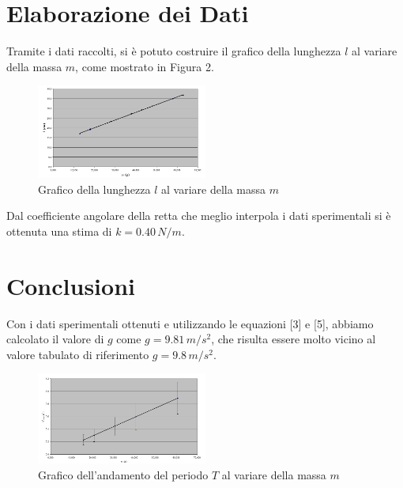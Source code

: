 \documentclass{article}
\begin{document}
    \section{Elaborazione dei Dati}
    Tramite i dati raccolti, si è potuto costruire il grafico della lunghezza $l$ al variare della massa $m$, come mostrato in Figura 2.

    \begin{figure}[H]
        \centering
        \includegraphics[width=0.5\textwidth]{fig2.jpg}
        \caption{Grafico della lunghezza $l$ al variare della massa $m$}
        \label{fig:grafico}
    \end{figure}

    Dal coefficiente angolare della retta che meglio interpola i dati sperimentali si è ottenuta una stima di $k = 0.40 \, N/m$.

    \section{Conclusioni}
    Con i dati sperimentali ottenuti e utilizzando le equazioni [3] e [5], abbiamo calcolato il valore di $g$ come $g = 9.81 \, m/s^2$, che risulta essere molto vicino al valore tabulato di riferimento $g = 9.8 \, m/s^2$.

    \begin{figure}[H]
        \centering
        \includegraphics[width=0.5\textwidth]{fig3.jpg}
        \caption{Grafico dell'andamento del periodo $T$ al variare della massa $m$}
        \label{fig:periodo}
    \end{figure}
\end{document}

